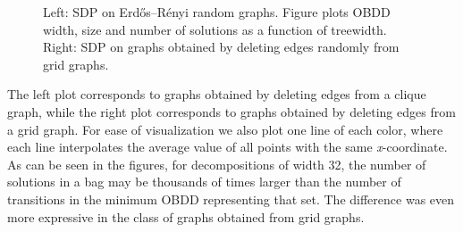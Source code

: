 \begin{figure}[h]
    \begin{subfigure}{0.48\textwidth}
        \centering
         \resizebox{\textwidth}{!}{}
        \label{fig:clique}
    \end{subfigure}
    \hfill
    \begin{subfigure}{0.48\textwidth}       
    \centering
    \resizebox{\textwidth}{!}{}
        \label{fig:grid}
    \end{subfigure}
    \caption{Left: SDP on Erd\H{o}s--R\'enyi random graphs. Figure plots OBDD width, size and number of solutions as a function of treewidth. Right: SDP on graphs obtained by deleting edges randomly from grid graphs. \label{fig:ComparisonSizes}}
   
\end{figure}
The left plot corresponds to graphs obtained by deleting edges from a clique graph, while the right plot corresponds to graphs obtained by deleting edges from a grid graph. 
For ease of visualization we also plot one line of each color, where each line interpolates the average value of all points with the same \textit{x}-coordinate. As can be seen in the figures, for decompositions of width 32, the number of solutions in a bag may be thousands of times larger than the number of transitions in the minimum OBDD representing that set. The difference was even more expressive in the class of graphs obtained from grid graphs. 

